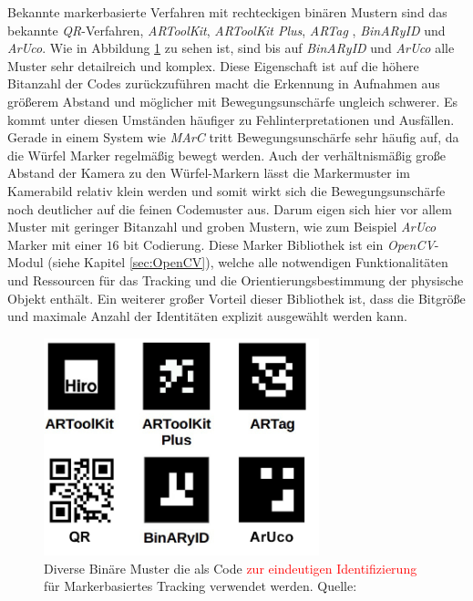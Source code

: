 Bekannte markerbasierte Verfahren mit rechteckigen binären Mustern sind das bekannte \textit{QR}-Verfahren, \textit{ARToolKit}\cite{article:MarkerARTOOL}, \textit{ARToolKit Plus}\cite{article:MarkerARTOOL2}, \textit{ARTag} \cite{article:MarkerARTag}, \textit{BinARyID} \cite{article:MarkerBinAR} und \textit{ArUco}\cite{article:Aruco2014}. Wie in Abbildung \ref{fig:BinMarker} zu sehen ist, sind bis auf \textit{BinARyID} und \textit{ArUco} alle Muster sehr detailreich und komplex. Diese Eigenschaft ist auf die höhere Bitanzahl der Codes zurückzuführen macht die Erkennung in Aufnahmen aus größerem Abstand und möglicher mit Bewegungsunschärfe ungleich schwerer. Es kommt unter diesen Umständen häufiger zu Fehlinterpretationen und Ausfällen. Gerade in einem System wie \textit{MArC} tritt Bewegungsunschärfe sehr häufig auf, da die Würfel Marker regelmäßig bewegt werden. Auch der verhältnismäßig große Abstand der Kamera zu den Würfel-Markern lässt die Markermuster im Kamerabild relativ klein werden und somit wirkt sich die Bewegungsunschärfe noch deutlicher auf die feinen Codemuster aus. Darum eigen sich hier vor allem Muster mit geringer Bitanzahl und groben Mustern, wie zum Beispiel \textit{ArUco} Marker mit einer $16$ bit Codierung. Diese Marker Bibliothek ist ein \textit{OpenCV}-Modul (siehe Kapitel \ref{sec:OpenCV}), welche alle notwendigen Funktionalitäten und Ressourcen für das Tracking und die Orientierungsbestimmung der physische Objekt enthält. Ein weiterer großer Vorteil dieser Bibliothek ist, dass die Bitgröße und maximale Anzahl der Identitäten explizit ausgewählt werden kann.


\begin{figure}[H] 
	\center 
	\includegraphics[width=8cm]{Bilder/BinMuster.jpg}			
	\caption{Diverse Binäre Muster die als Code \textcolor{red}{zur eindeutigen Identifizierung }für Markerbasiertes Tracking verwendet werden. Quelle: \cite{article:Aruco2014}}
	\label{fig:BinMarker}
\end{figure}

\newpage